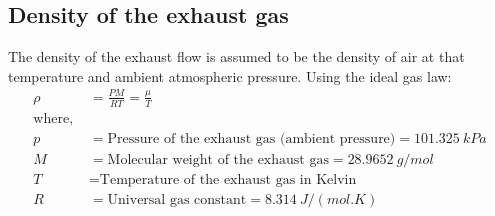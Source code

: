\subsection{Density of the exhaust gas}

The density of the exhaust flow is assumed to be the density of air at that
temperature and ambient atmospheric pressure. Using the ideal gas law:
\begin{align*}
    \rho &= \frac{PM}{R T} = \frac{\mu}{T}\\
    \text{where, } &\\
    p &= \text{Pressure of the exhaust gas (ambient pressure)} = 101.325 \: kPa\\
    M &= \text{Molecular weight of the exhaust gas} = 28.9652 \: g/mol\\
    T &= \text{Temperature of the exhaust gas in Kelvin}\\
    R &= \text{Universal gas constant} = 8.314 \: J/(mol.K)\\
\end{align*}
